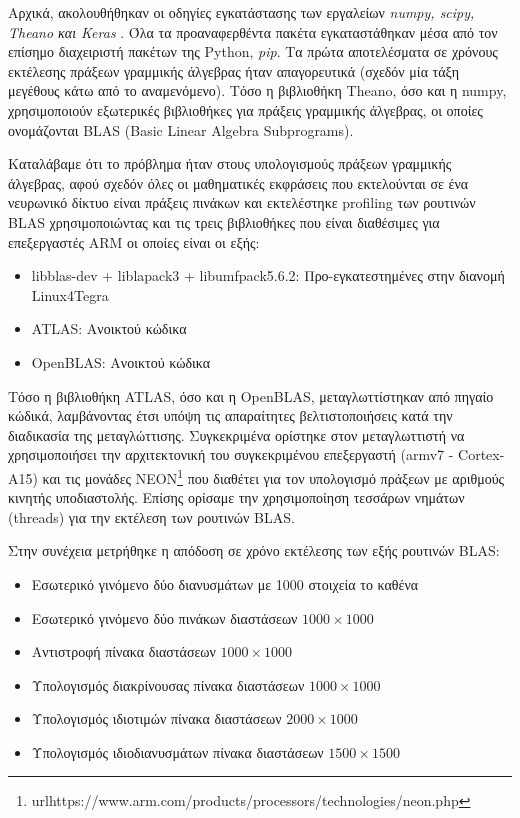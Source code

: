 Αρχικά, ακολουθήθηκαν οι οδηγίες εγκατάστασης των εργαλείων \emph{numpy, scipy, Theano και Keras}
. Όλα τα προαναφερθέντα πακέτα εγκαταστάθηκαν μέσα από τον επίσημο διαχειριστή πακέτων της Python, \emph{pip}.
Τα πρώτα αποτελέσματα σε χρόνους εκτέλεσης πράξεων γραμμικής άλγεβρας ήταν
απαγορευτικά (σχεδόν μία τάξη μεγέθους κάτω από το αναμενόμενο).
Τόσο η βιβλιοθήκη Theano, όσο και η numpy, χρησιμοποιούν εξωτερικές βιβλιοθήκες
για πράξεις γραμμικής άλγεβρας, οι οποίες ονομάζονται BLAS (Basic Linear Algebra Subprograms).

Καταλάβαμε ότι το πρόβλημα ήταν στους υπολογισμούς πράξεων γραμμικής άλγεβρας,
αφού σχεδόν όλες οι μαθηματικές εκφράσεις που εκτελούνται σε ένα
νευρωνικό δίκτυο είναι πράξεις πινάκων και εκτελέστηκε profiling των
ρουτινών BLAS χρησιμοποιώντας και τις τρεις βιβλιοθήκες που είναι διαθέσιμες για
επεξεργαστές ARM οι οποίες είναι οι εξής:
\begin{itemize}
  \item{libblas-dev + liblapack3 + libumfpack5.6.2: Προ-εγκατεστημένες στην διανομή Linux4Tegra}
  \item{ATLAS: Ανοικτού κώδικα}
  \item{OpenBLAS: Ανοικτού κώδικα}
\end{itemize}

Τόσο η βιβλιοθήκη ATLAS, όσο και η OpenBLAS, μεταγλωττίστηκαν από πηγαίο κώδικά,
λαμβάνοντας έτσι υπόψη τις απαραίτητες βελτιστοποιήσεις κατά την διαδικασία
της μεταγλώττισης.
Συγκεκριμένα ορίστηκε στον μεταγλωττιστή να χρησιμοποιήσει την αρχιτεκτονική του
συγκεκριμένου επεξεργαστή (armv7 - Cortex-A15) και τις μονάδες
NEON\footnote{url{https://www.arm.com/products/processors/technologies/neon.php}}
που διαθέτει για τον υπολογισμό πράξεων με αριθμούς κινητής %
υποδιαστολής. Επίσης ορίσαμε την χρησιμοποίηση τεσσάρων νημάτων (threads)
για την εκτέλεση των ρουτινών BLAS.

Στην συνέχεια μετρήθηκε η απόδοση σε χρόνο εκτέλεσης των εξής ρουτινών BLAS:
\begin{itemize}
  \item{Εσωτερικό γινόμενο δύο διανυσμάτων με 1000 στοιχεία το καθένα}
  \item{Εσωτερικό γινόμενο δύο πινάκων διαστάσεων $1000 \times 1000$}
  \item{Αντιστροφή πίνακα διαστάσεων $1000 \times 1000$}
  \item{Υπολογισμός διακρίνουσας πίνακα διαστάσεων $1000 \times 1000$}
  \item{Υπολογισμός ιδιοτιμών πίνακα διαστάσεων $2000 \times 1000$}
  \item{Υπολογισμός ιδιοδιανυσμάτων πίνακα διαστάσεων $1500 \times 1500$}
\end{itemize}

